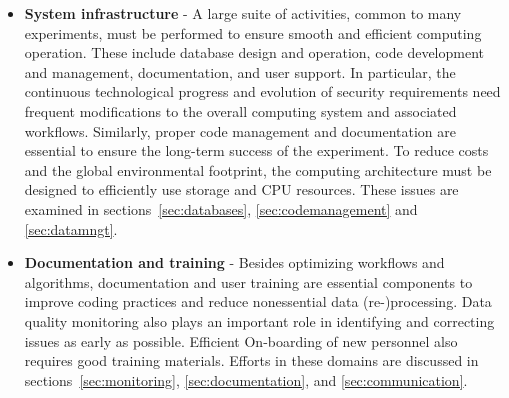 \begin{itemize}
\item[] {\bf System infrastructure} - A large suite of activities, common to many experiments, must be performed to ensure smooth and efficient computing operation. These include database design and operation, code development and management, documentation, and user support. In particular, the continuous technological progress and evolution of security requirements need frequent modifications to the overall computing system and associated workflows. Similarly, proper code management and documentation are essential to ensure the long-term success of the experiment. To reduce costs and the global environmental footprint, the computing architecture must be designed to efficiently use storage and CPU resources. These issues are examined in sections~\ref{sec:databases}, \ref{sec:codemanagement} and \ref{sec:datamngt}.

\item[] {\bf Documentation and training} - Besides optimizing workflows and algorithms, documentation and user training are essential components to improve coding practices and reduce nonessential data (re-)processing. Data quality monitoring also plays an important role in identifying and correcting issues as early as possible. Efficient On-boarding of new personnel also requires good training materials. Efforts in these domains are discussed in sections~\ref{sec:monitoring}, \ref{sec:documentation}, and \ref{sec:communication}.
\end{itemize} 